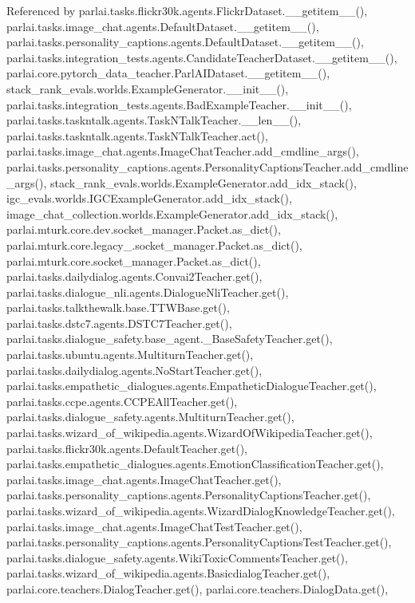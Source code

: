 Referenced by parlai.\+tasks.\+flickr30k.\+agents.\+Flickr\+Dataset.\+\_\+\+\_\+getitem\+\_\+\+\_\+(), parlai.\+tasks.\+image\+\_\+chat.\+agents.\+Default\+Dataset.\+\_\+\+\_\+getitem\+\_\+\+\_\+(), parlai.\+tasks.\+personality\+\_\+captions.\+agents.\+Default\+Dataset.\+\_\+\+\_\+getitem\+\_\+\+\_\+(), parlai.\+tasks.\+integration\+\_\+tests.\+agents.\+Candidate\+Teacher\+Dataset.\+\_\+\+\_\+getitem\+\_\+\+\_\+(), parlai.\+core.\+pytorch\+\_\+data\+\_\+teacher.\+Parl\+A\+I\+Dataset.\+\_\+\+\_\+getitem\+\_\+\+\_\+(), stack\+\_\+rank\+\_\+evals.\+worlds.\+Example\+Generator.\+\_\+\+\_\+init\+\_\+\+\_\+(), parlai.\+tasks.\+integration\+\_\+tests.\+agents.\+Bad\+Example\+Teacher.\+\_\+\+\_\+init\+\_\+\+\_\+(), parlai.\+tasks.\+taskntalk.\+agents.\+Task\+N\+Talk\+Teacher.\+\_\+\+\_\+len\+\_\+\+\_\+(), parlai.\+tasks.\+taskntalk.\+agents.\+Task\+N\+Talk\+Teacher.\+act(), parlai.\+tasks.\+image\+\_\+chat.\+agents.\+Image\+Chat\+Teacher.\+add\+\_\+cmdline\+\_\+args(), parlai.\+tasks.\+personality\+\_\+captions.\+agents.\+Personality\+Captions\+Teacher.\+add\+\_\+cmdline\+\_\+args(), stack\+\_\+rank\+\_\+evals.\+worlds.\+Example\+Generator.\+add\+\_\+idx\+\_\+stack(), igc\+\_\+evals.\+worlds.\+I\+G\+C\+Example\+Generator.\+add\+\_\+idx\+\_\+stack(), image\+\_\+chat\+\_\+collection.\+worlds.\+Example\+Generator.\+add\+\_\+idx\+\_\+stack(), parlai.\+mturk.\+core.\+dev.\+socket\+\_\+manager.\+Packet.\+as\+\_\+dict(), parlai.\+mturk.\+core.\+legacy\+\_.\+socket\+\_\+manager.\+Packet.\+as\+\_\+dict(), parlai.\+mturk.\+core.\+socket\+\_\+manager.\+Packet.\+as\+\_\+dict(), parlai.\+tasks.\+dailydialog.\+agents.\+Convai2\+Teacher.\+get(), parlai.\+tasks.\+dialogue\+\_\+nli.\+agents.\+Dialogue\+Nli\+Teacher.\+get(), parlai.\+tasks.\+talkthewalk.\+base.\+T\+T\+W\+Base.\+get(), parlai.\+tasks.\+dstc7.\+agents.\+D\+S\+T\+C7\+Teacher.\+get(), parlai.\+tasks.\+dialogue\+\_\+safety.\+base\+\_\+agent.\+\_\+\+Base\+Safety\+Teacher.\+get(), parlai.\+tasks.\+ubuntu.\+agents.\+Multiturn\+Teacher.\+get(), parlai.\+tasks.\+dailydialog.\+agents.\+No\+Start\+Teacher.\+get(), parlai.\+tasks.\+empathetic\+\_\+dialogues.\+agents.\+Empathetic\+Dialogue\+Teacher.\+get(), parlai.\+tasks.\+ccpe.\+agents.\+C\+C\+P\+E\+All\+Teacher.\+get(), parlai.\+tasks.\+dialogue\+\_\+safety.\+agents.\+Multiturn\+Teacher.\+get(), parlai.\+tasks.\+wizard\+\_\+of\+\_\+wikipedia.\+agents.\+Wizard\+Of\+Wikipedia\+Teacher.\+get(), parlai.\+tasks.\+flickr30k.\+agents.\+Default\+Teacher.\+get(), parlai.\+tasks.\+empathetic\+\_\+dialogues.\+agents.\+Emotion\+Classification\+Teacher.\+get(), parlai.\+tasks.\+image\+\_\+chat.\+agents.\+Image\+Chat\+Teacher.\+get(), parlai.\+tasks.\+personality\+\_\+captions.\+agents.\+Personality\+Captions\+Teacher.\+get(), parlai.\+tasks.\+wizard\+\_\+of\+\_\+wikipedia.\+agents.\+Wizard\+Dialog\+Knowledge\+Teacher.\+get(), parlai.\+tasks.\+image\+\_\+chat.\+agents.\+Image\+Chat\+Test\+Teacher.\+get(), parlai.\+tasks.\+personality\+\_\+captions.\+agents.\+Personality\+Captions\+Test\+Teacher.\+get(), parlai.\+tasks.\+dialogue\+\_\+safety.\+agents.\+Wiki\+Toxic\+Comments\+Teacher.\+get(), parlai.\+tasks.\+wizard\+\_\+of\+\_\+wikipedia.\+agents.\+Basicdialog\+Teacher.\+get(), parlai.\+core.\+teachers.\+Dialog\+Teacher.\+get(), parlai.\+core.\+teachers.\+Dialog\+Data.\+get(), 